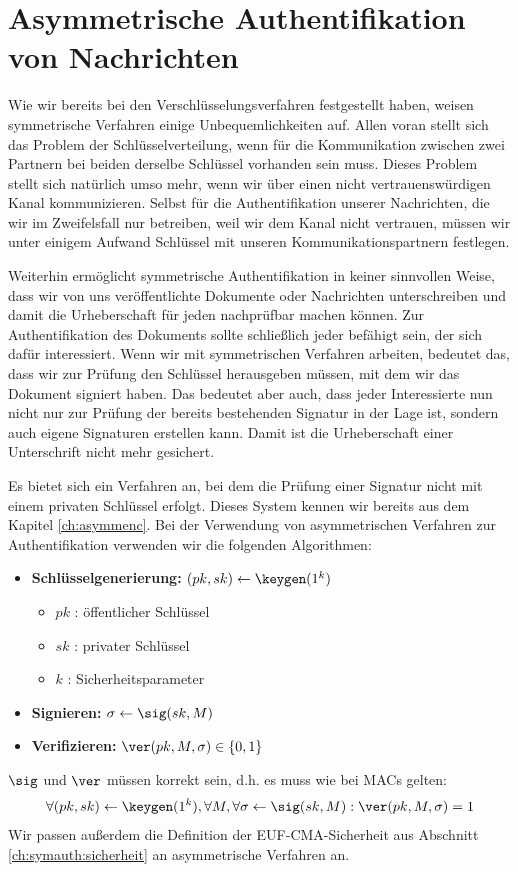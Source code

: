 \chapter{Asymmetrische Authentifikation von Nachrichten}
\label{cha:asymmauth}

Wie wir bereits bei den Verschlüsselungsverfahren festgestellt haben, weisen symmetrische Verfahren einige Unbequemlichkeiten auf. Allen voran stellt sich das Problem der Schlüsselverteilung, wenn für die Kommunikation zwischen zwei Partnern bei beiden derselbe Schlüssel vorhanden sein muss. Dieses Problem stellt sich natürlich umso mehr, wenn wir über einen nicht vertrauenswürdigen Kanal kommunizieren. Selbst für die Authentifikation unserer Nachrichten, die wir im Zweifelsfall nur betreiben, weil wir dem Kanal nicht vertrauen, müssen wir unter einigem Aufwand Schlüssel mit unseren Kommunikationspartnern festlegen.

Weiterhin ermöglicht symmetrische Authentifikation in keiner sinnvollen Weise, dass wir von uns veröffentlichte Dokumente oder Nachrichten unterschreiben und damit die Urheberschaft für jeden nachprüfbar machen können. Zur Authentifikation des Dokuments sollte schließlich jeder befähigt sein, der sich dafür interessiert. Wenn wir mit symmetrischen Verfahren arbeiten, bedeutet das, dass wir zur Prüfung den Schlüssel herausgeben müssen, mit dem wir das Dokument signiert haben. Das bedeutet aber auch, dass jeder Interessierte nun nicht nur zur Prüfung der bereits bestehenden Signatur in der Lage ist, sondern auch eigene Signaturen erstellen kann. Damit ist die Urheberschaft einer Unterschrift nicht mehr gesichert.

Es bietet sich ein Verfahren an, bei dem die Prüfung einer Signatur nicht mit einem privaten Schlüssel erfolgt. Dieses System kennen wir bereits aus dem Kapitel \ref{ch:asymmenc}. Bei der Verwendung von asymmetrischen Verfahren zur Authentifikation verwenden wir die folgenden Algorithmen:
\begin{itemize}
  \item \textbf{Schlüsselgenerierung:} $(pk, sk) \leftarrow \keygen(1^k)$
    \begin{itemize}
      \item $pk$ : öffentlicher Schlüssel
      \item $sk$ : privater Schlüssel
      \item $k$ : Sicherheitsparameter
    \end{itemize}
  \item \textbf{Signieren:} $\sigma \leftarrow \sig(sk,M)$
  \item \textbf{Verifizieren:} $\ver(pk,M,\sigma) \in \{ 0,1 \}$
\end{itemize}
$\sig$ und $\ver$ müssen korrekt sein, d.h. es muss wie bei MACs gelten:
\begin{equation*}
    \forall (pk,sk) \leftarrow \keygen(1^k), \forall M, \forall \sigma \leftarrow \sig(sk,M) : \ver(pk,M,\sigma) = 1
\end{equation*}
Wir passen außerdem die Definition der EUF-CMA-Sicherheit aus Abschnitt
\ref{ch:symauth:sicherheit} an asymmetrische Verfahren an.

